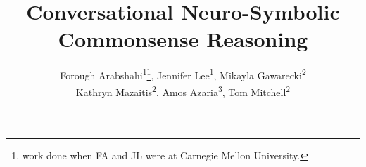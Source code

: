 \documentclass[letterpaper]{article} %
\title{Conversational Neuro-Symbolic Commonsense Reasoning}
\author{Forough Arabshahi\textsuperscript{\rm 1}\footnote{work done when FA and JL were at Carnegie Mellon University.}, Jennifer Lee\textsuperscript{\rm 1}, Mikayla Gawarecki\textsuperscript{\rm 2}\\ Kathryn Mazaitis\textsuperscript{\rm 2}, Amos Azaria\textsuperscript{\rm 3}, Tom Mitchell\textsuperscript{\rm 2}\\ %
}
\begin{document}
\maketitle




% 



% 

% 

% 


% 


% 
% 
{}
% 

\end{document}
